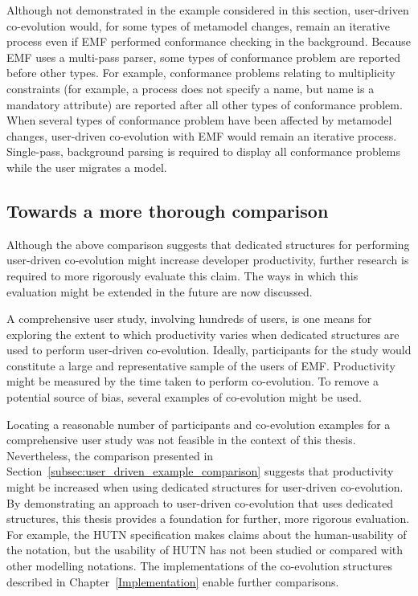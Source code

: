 Although not demonstrated in the example considered in this section, user-driven co-evolution would, for some types of metamodel changes, remain an iterative process even if EMF performed conformance checking in the background. Because EMF uses a multi-pass parser, some types of conformance problem are reported before other types. For example, conformance problems relating to multiplicity constraints (for example, a process does not specify a name, but name is a mandatory attribute) are reported after all other types of conformance problem. When several types of conformance problem have been affected by metamodel changes, user-driven co-evolution with EMF would remain an iterative process. Single-pass, background parsing is required to display all conformance problems while the user migrates a model.

\subsection{Towards a more thorough comparison}
\label{subsec:user_driven_further_work}
Although the above comparison suggests that dedicated structures for performing user-driven co-evolution might increase developer productivity, further research is required to more rigorously evaluate this claim. The ways in which this evaluation might be extended in the future are now discussed.

A comprehensive user study, involving hundreds of users, is one means for exploring the extent to which productivity varies when dedicated structures are used to perform user-driven co-evolution. Ideally, participants for the study would constitute a large and representative sample of the users of EMF. Productivity might be measured by the time taken to perform co-evolution. To remove a potential source of bias, several examples of co-evolution might be used.



Locating a reasonable number of participants and co-evolution examples for a comprehensive user study was not feasible in the context of this thesis. Nevertheless, the comparison presented in Section~\ref{subsec:user_driven_example_comparison} suggests that productivity might be increased when using dedicated structures for user-driven co-evolution. By demonstrating an approach to user-driven co-evolution that uses dedicated structures, this thesis provides a foundation for further, more rigorous evaluation. For example, the HUTN specification \cite{hutn} makes claims about the human-usability of the notation, but the usability of HUTN has not been studied or compared with other modelling notations. The implementations of the co-evolution structures described in Chapter~\ref{Implementation} enable further comparisons.


